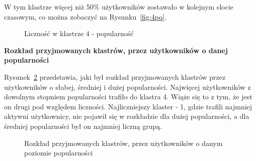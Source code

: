 \documentclass[polish,12pt]{aghthesis}
\begin{document}
\begin{itemize}
W tym klastrze więcej niż 50\% użytkowników zostawało w kolejnym slocie czasowym, co można zobaczyć na Rysunku~\ref{fig:4pq}.

   \begin{figure}[ht] 
    \centering
    \hfill%
    \caption{Liczność w klastrze 4 - popularność}
    \label{f:4p}
    \end{figure}
    

\FloatBarrier


    
\end{itemize}


\textbf{Rozkład przyjmowanych klastrów, przez użytkowników o danej popularności}

\vspace{5mm}
 
 Rysunek~\ref{pie:p} przedstawia, jaki był rozkład przyjmowanych klastrów przez użytkowników o słabej, średniej i dużej popularności. Najwięcej użytkowników z dowolnym stopniem popularności trafiło do klastra 4. Wiąże się to z tym, że jest on drugi pod względem liczności. Najliczniejszy klaster - 1, gdzie trafili najmniej aktywni użytkownicy, nie pojawił się w rozkładzie dla dużej popularności, a dla średniej popularności był on najmniej liczną grupą. 
 
 \begin{figure}

\begin{minipage}{.5\linewidth}
\centering
{}
\end{minipage}%
\begin{minipage}{.5\linewidth}
\centering
{}
\end{minipage}\par\medskip
\centering
{}

\caption{Rozkład przyjmowanych klastrów, przez użytkowników o danym poziomie popularności}
\label{pie:p}
\end{figure}
\end{document}
